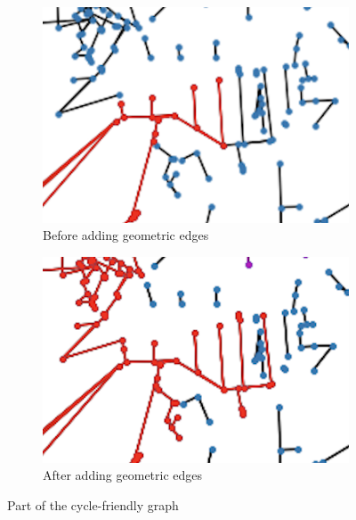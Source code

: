\documentclass[12pt,a4paper]{report}
\begin{document}
\begin{figure}[ht]
    \centering
    \begin{subfigure}[ht]{0.45\textwidth}
        \centering
        \includegraphics[width=\textwidth]{diss_images/impl/close_before.png}
        \caption{Before adding geometric edges}
        \label{fig:close before}
    \end{subfigure}
    \hfill
    \begin{subfigure}[ht]{0.45\textwidth}
        \centering
        \includegraphics[width=\textwidth]{diss_images/impl/close_after.png}
        \caption{After adding geometric edges}
        \label{fig:close after}
    \end{subfigure}
       \caption{Part of the cycle-friendly graph}
       \label{fig:close example}
\end{figure}
\end{document}
